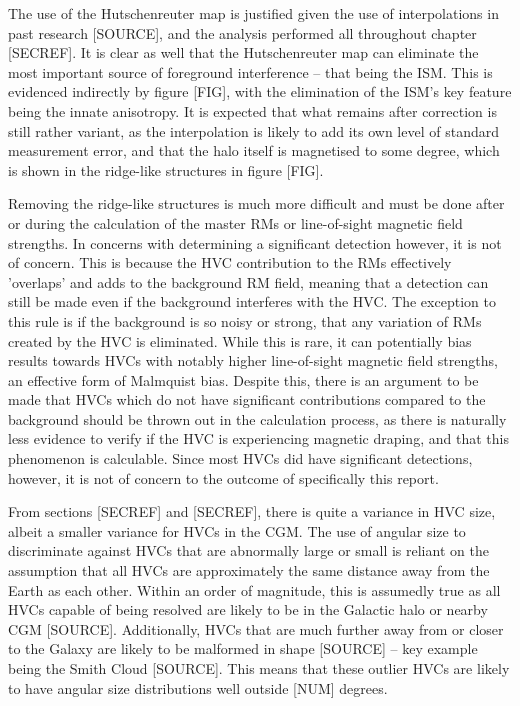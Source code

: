 The use of the Hutschenreuter map is justified given the use of interpolations in past research [SOURCE], and the analysis performed all throughout chapter [SECREF]. It is clear as well that the Hutschenreuter map can eliminate the most important source of foreground interference – that being the ISM. This is evidenced indirectly by figure [FIG], with the elimination of the ISM's key feature being the innate anisotropy. It is expected that what remains after correction is still rather variant, as the interpolation is likely to add its own level of standard measurement error, and that the halo itself is magnetised to some degree, which is shown in the ridge-like structures in figure [FIG].


Removing the ridge-like structures is much more difficult and must be done after or during the calculation of the master RMs or line-of-sight magnetic field strengths. In concerns with determining a significant detection however, it is not of concern. This is because the HVC contribution to the RMs effectively 'overlaps' and adds to the background RM field, meaning that a detection can still be made even if the background interferes with the HVC. The exception to this rule is if the background is so noisy or strong, that any variation of RMs created by the HVC is eliminated. While this is rare, it can potentially bias results towards HVCs with notably higher line-of-sight magnetic field strengths, an effective form of Malmquist bias. Despite this, there is an argument to be made that HVCs which do not have significant contributions compared to the background should be thrown out in the calculation process, as there is naturally less evidence to verify if the HVC is experiencing magnetic draping, and that this phenomenon is calculable. Since most HVCs did have significant detections, however, it is not of concern to the outcome of specifically this report.


From sections [SECREF] and [SECREF], there is quite a variance in HVC size, albeit a smaller variance for HVCs in the CGM. The use of angular size to discriminate against HVCs that are abnormally large or small is reliant on the assumption that all HVCs are approximately the same distance away from the Earth as each other. Within an order of magnitude, this is assumedly true as all HVCs capable of being resolved are likely to be in the Galactic halo or nearby CGM [SOURCE]. Additionally, HVCs that are much further away from or closer to the Galaxy are likely to be malformed in shape [SOURCE] – key example being the Smith Cloud [SOURCE]. This means that these outlier HVCs are likely to have angular size distributions well outside [NUM] degrees.


